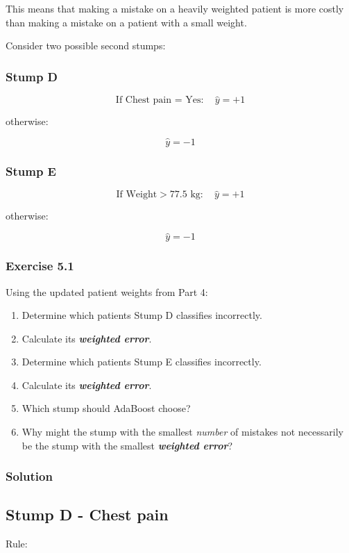 \documentclass[10pt]{article}
\begin{document}
This means that making a mistake on a heavily weighted patient is more costly than making a mistake on a patient with a small weight.

Consider two possible second stumps:

\subsubsection*{Stump D}
\[
\text{If Chest pain = Yes}:
\quad \hat y=+1
\]

otherwise:

\[
\hat y=-1
\]

\subsubsection*{Stump E}
\[
\text{If Weight}>77.5\text{ kg}:
\quad \hat y=+1
\]

otherwise:

\[
\hat y=-1
\]

\subsubsection*{Exercise 5.1}
Using the updated patient weights from Part 4:

\begin{enumerate}
\item
Determine which patients Stump D classifies incorrectly.

\item
Calculate its \textbf{\textit{weighted error}}.

\item
Determine which patients Stump E classifies incorrectly.

\item
Calculate its \textbf{\textit{weighted error}}.

\item
Which stump should AdaBoost choose?

\item
Why might the stump with the smallest \emph{number} of mistakes not necessarily be the stump with the smallest \textbf{\textit{weighted error}}?

\end{enumerate}
\begingroup\color{red}

\subsubsection*{Solution}
\subsection*{Stump D - Chest pain}
Rule:
\end{document}
